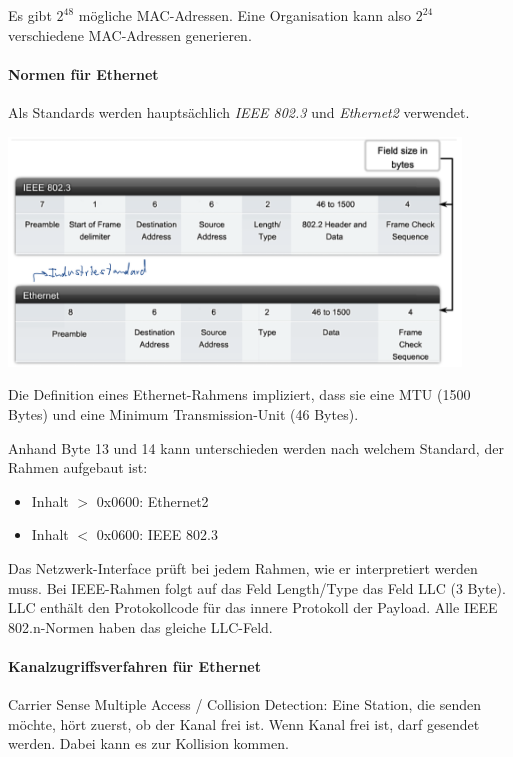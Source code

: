 \documentclass[a4paper,12pt]{article}
\begin{document}
Es gibt $2^{48}$ mögliche MAC-Adressen. Eine Organisation kann also $2^{24}$ verschiedene MAC-Adressen generieren.


\paragraph{Normen für Ethernet}
Als Standards werden hauptsächlich \emph{IEEE 802.3} und \emph{Ethernet2} verwendet.


\begin{center}
\includegraphics[width=12cm]{img/05_Ethernet_Rahmen.png}
\end{center}

Die Definition eines Ethernet-Rahmens impliziert, dass sie eine MTU (1500 Bytes) und eine Minimum Transmission-Unit (46 Bytes).

Anhand Byte 13 und 14 kann unterschieden werden nach welchem Standard, der Rahmen aufgebaut ist:
\begin{itemize}
\item Inhalt $>$ 0x0600: Ethernet2
\item Inhalt $<$ 0x0600: IEEE 802.3
\end{itemize}

Das Netzwerk-Interface prüft bei jedem Rahmen, wie er interpretiert werden muss. Bei IEEE-Rahmen folgt auf das Feld Length/Type das Feld LLC (3 Byte). LLC enthält den Protokollcode für das innere Protokoll der Payload. Alle IEEE 802.n-Normen haben das gleiche LLC-Feld.



\paragraph{Kanalzugriffsverfahren für Ethernet}
Carrier Sense Multiple Access / Collision Detection: Eine Station, die senden möchte, hört zuerst, ob der Kanal frei ist. Wenn Kanal frei ist, darf gesendet werden. Dabei kann es zur Kollision kommen.
\end{document}
